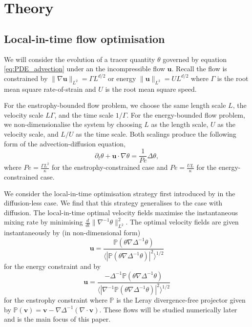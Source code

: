 \documentclass[12pt]{iopart}
\newcommand{\ddt}[1]{\frac{d #1}{dt}}
\newcommand{\hmone}[1]{\|\nabla^{-1} #1\|_{L^{2}}}
\newcommand{\ltwo}[1]{\|#1\|_{L^{2}}}
\renewcommand{\vec}[1]{\mathbf{#1}}
\renewcommand{\u}{\mathbf{u}}
\newcommand{\ppt}[1]{\partial_{t} #1}
\newcommand{\lap}{\Delta }
\newcommand{\invlap}{\Delta^{-1}}
\begin{document}


\section{Theory}
\label{sec:theory}
\subsection{Local-in-time flow optimisation}

We will consider the evolution of a tracer quantity $\theta$ governed by equation \ref{eq:PDE_advection} under an the incompressible flow $\vec{u}$.  Recall the flow is constrained by $\ltwo{\nabla\u} = \Gamma L^{d/2}$ or energy $\ltwo{\u} = UL^{d/2}$ where $\Gamma$ is the root mean square rate-of-strain and $U$ is the root mean square speed. 

For the enstrophy-bounded flow problem, we choose the same length scale $L$, the velocity scale $L\Gamma $, and  the time scale $1/\Gamma$. For the energy-bounded flow problem, we non-dimensionalise the system by choosing $L$ as the length scale, $U$ as the velocity scale, and $L/U$ as the time scale.  Both scalings produce the following form of the advection-diffusion equation,
\begin{equation}
\label{eq:nd_ade}
	\ppt{\theta}+\mathbf{u}\cdot \nabla \theta=\frac{1}{Pe} \lap\theta,
\end{equation}
where $Pe=  \frac{\Gamma L^2}{\kappa}$ for the enstrophy-constrained case and $Pe= \frac{UL}{\kappa}$ for the energy-constrained case.   

We consider the local-in-time optimisation strategy first introduced by \cite{JFM2011} in the diffusion-less case. We find that this strategy generalises to the case with diffusion. The local-in-time optimal velocity fields maximise the instantaneous mixing rate by minimising $\ddt{}\hmone{\theta}^2$. The optimal velocity fields are given instantaneously by (in non-dimensional form)
%
\begin{equation}
\mathbf{u}= \frac{\mathds{P}(\theta \nabla \invlap\theta)}{\langle |\mathds{P}(\theta \nabla \invlap\theta)|^2\rangle^{1/2}}
\end{equation} 
%
for the energy constraint and by 
%
\begin{equation}
\mathbf{u}= \frac{-\invlap\mathds{P}(\theta \nabla \invlap\theta)}{\langle |\nabla^{-1}\mathds{P}(\theta \nabla \invlap\theta)|^2\rangle^{1/2}}
\end{equation}
%
for the enstrophy constraint where $\mathds{P}$ is the Leray divergence-free projector given by $\mathds{P}(\vec{v}) = \vec{v} - \nabla \Delta^{-1}(\nabla \cdot \vec{v})$. These flows will be studied numerically later and is the main focus of this paper.
\end{document}
